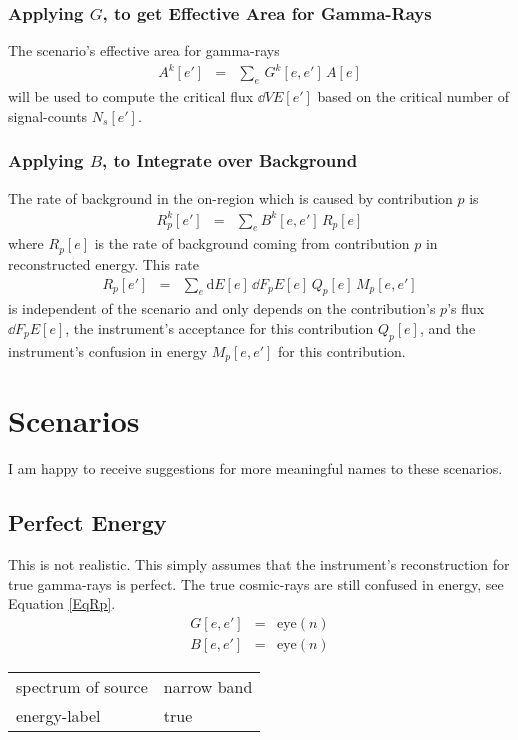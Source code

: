 \documentclass{article}%
\begin{document}
            \subsubsection*{Applying $G$, to get Effective Area for Gamma-Rays}
                The scenario's effective area for gamma-rays
                \begin{eqnarray}
                    A^k[e'] &=& \sum_{e} \, G^k[e, e'] \, A[e]
                \end{eqnarray}
                will be used to compute the critical flux $\dd{V}{E}[e']$ based on the critical number of signal-counts $N_s[e']$.
            \subsubsection*{Applying $B$, to Integrate over Background}
                The rate of background in the on-region which is caused by contribution $p$ is
                \begin{eqnarray}
                    R^k_p[e'] &=& \sum_{e} B^k[e, e'] \, R_p[e]
                \end{eqnarray}
                where $R_p[e]$ is the rate of background coming from contribution $p$ in reconstructed energy.
                This rate
                \begin{eqnarray}
                    R_p[e'] &=& \sum_{e} \text{d}E[e] \, \dd{F_p}{E}[e] \, Q_p[e] \, M_p[e, e']
                    \label{EqRp}
                \end{eqnarray}
                 is independent of the scenario and only depends on the contribution's $p$'s flux $\dd{F_p}{E}[e]$, the instrument's acceptance for this contribution $Q_p[e]$, and the instrument's confusion in energy $M_p[e, e']$ for this contribution.
    \section{Scenarios}
        I am happy to receive suggestions for more meaningful names to these scenarios.
    \subsection{Perfect Energy}
    This is not realistic. This simply assumes that the instrument's reconstruction for true gamma-rays is perfect.
    The true cosmic-rays are still confused in energy, see Equation \ref{EqRp}.
    \begin{eqnarray}
        G[e, e'] &=& \mathrm{eye}(n)
        \\
        B[e, e'] &=& \mathrm{eye}(n)
    \end{eqnarray}
    \begin{center}
        \begin{tabular}{ll}
            spectrum of source & narrow band\\
            energy-label & true\\
        \end{tabular}
    \end{center}
\end{document}
